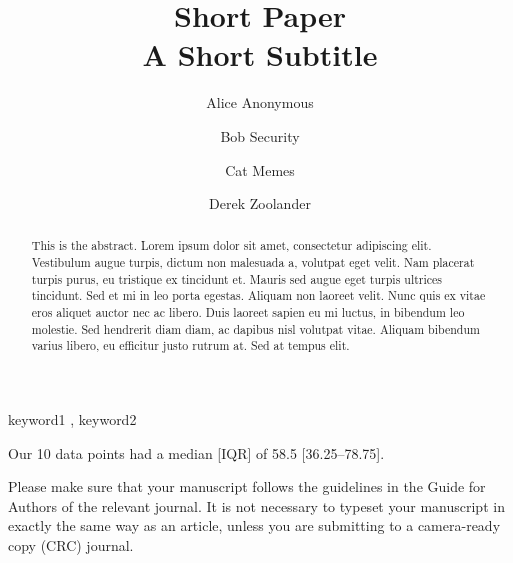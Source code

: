 \documentclass[
  authoryear,
  preprint]{elsarticle}
\begin{document}
\begin{frontmatter}
\title{Short Paper \\\large{A Short Subtitle} }
\author[1]{Alice Anonymous%
%
}
\author[2]{Bob Security%
%
}
\author[2]{Cat Memes%
%
}
\author[]{Derek Zoolander%
%
}



        
\begin{abstract}
This is the abstract. Lorem ipsum dolor sit amet, consectetur adipiscing
elit. Vestibulum augue turpis, dictum non malesuada a, volutpat eget
velit. Nam placerat turpis purus, eu tristique ex tincidunt et. Mauris
sed augue eget turpis ultrices tincidunt. Sed et mi in leo porta
egestas. Aliquam non laoreet velit. Nunc quis ex vitae eros aliquet
auctor nec ac libero. Duis laoreet sapien eu mi luctus, in bibendum leo
molestie. Sed hendrerit diam diam, ac dapibus nisl volutpat vitae.
Aliquam bibendum varius libero, eu efficitur justo rutrum at. Sed at
tempus elit.
\end{abstract}





\begin{keyword}
    keyword1 \sep 
    keyword2
\end{keyword}
\end{frontmatter}
    

Our 10 data points had a median {[}IQR{]} of 58.5 {[}36.25--78.75{]}.

Please make sure that your manuscript follows the guidelines in the
Guide for Authors of the relevant journal. It is not necessary to
typeset your manuscript in exactly the same way as an article, unless
you are submitting to a camera-ready copy (CRC) journal.
\end{document}
